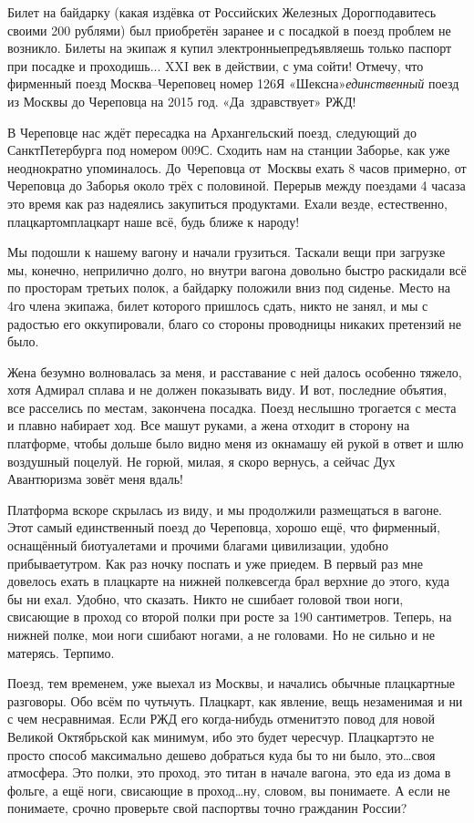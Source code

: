 Билет на байдарку (какая издёвка от Российских Железных Дорог\mdash подавитесь своими 200 рублями) был приобретён заранее и с посадкой в поезд проблем не возникло. Билеты на экипаж я купил электронные\mdash предъявляешь только паспорт при посадке и проходишь... XXI век в действии, с ума сойти! Отмечу, что фирменный поезд Москва\nobreakdash--Череповец номер 126Я «Шексна»\mdash \textit{единственный} поезд из Москвы до Череповца на 2015 год. «Да~здравствует» РЖД!
 
В Череповце нас ждёт пересадка на Архангельский поезд, следующий до Санкт\sdash Петербурга под номером 009С. Сходить нам на станции Заборье, как уже неоднократно упоминалось. До~Череповца от~Москвы ехать 8 часов примерно, от Череповца до Заборья около трёх с половиной. Перерыв между поездами 4 часа\mdash за это время как раз надеялись закупиться продуктами. Ехали везде, естественно, плацкартом\mdash плацкарт наше всё, будь ближе к народу! 

Мы подошли к нашему вагону и начали грузиться. Таскали вещи при загрузке мы, конечно, неприлично долго, но внутри вагона довольно быстро раскидали всё по просторам третьих полок, а байдарку положили вниз под сиденье. Место на 4\sdash го члена экипажа, билет которого пришлось сдать, никто не занял, и мы с радостью его оккупировали, благо со стороны проводницы никаких претензий не было.

Жена безумно волновалась за меня, и расставание с ней далось особенно тяжело, хотя Адмирал сплава и не должен показывать виду. И вот, последние объятия, все расселись по местам, закончена посадка. Поезд неслышно трогается с места и плавно набирает ход. Все машут руками, а жена отходит в сторону на платформе, чтобы дольше было видно меня из окна\mdash машу ей рукой в ответ и шлю воздушный поцелуй. Не горюй, милая, я скоро вернусь, а сейчас Дух Авантюризма зовёт меня вдаль!

Платформа вскоре скрылась из виду, и мы продолжили размещаться в вагоне. Этот самый единственный поезд до Череповца, хорошо ещё, что фирменный, оснащённый биотуалетами и прочими благами цивилизации, удобно прибывает\mdash утром. Как раз ночку поспать и уже приедем. В первый раз мне довелось ехать в плацкарте на нижней полке\mdash всегда брал верхние до этого, куда бы ни ехал. Удобно, что сказать. Никто не сшибает головой твои ноги, свисающие в проход со второй полки при росте за 190 сантиметров. Теперь, на нижней полке, мои ноги сшибают ногами, а не головами. Но не сильно и не матерясь. Терпимо. 

Поезд, тем временем, уже выехал из Москвы, и начались обычные плацкартные разговоры.  Обо всём по чуть\sdash чуть. Плацкарт, как явление, вещь незаменимая и ни с чем несравнимая. Если РЖД его когда-нибудь отменит\mdash это повод для новой Великой Октябрьской как минимум, ибо это будет чересчур. Плацкарт\mdash это не просто способ максимально дешево добраться куда бы то ни было, это\ldots своя атмосфера. Это полки, это проход, это титан в начале вагона, это еда из дома в фольге, а ещё ноги, свисающие в проход\ldots ну, словом, вы понимаете. А если не понимаете, срочно проверьте свой паспорт\mdash вы точно гражданин России? 

